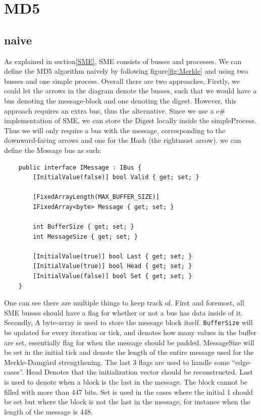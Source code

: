\documentclass[11pt]{article}
\author{John Doe}
\date{\today}
\title{}
\begin{document}
\tableofcontents

\section{MD5}
\label{sec:orgc4d98d5}

\subsection{naive}
\label{MD5naive}
As explained in section\ref{SME}, SME consists of busses and processes. We can define the MD5 algorithm naively by following figure\ref{fig:Merkle} and using two busses and one simple process. Overall there are two approaches,
Firstly, we could let the arrows in the diagram denote the busses, such that we would have a bus denoting the message-block and one denoting the digest. However, this approach requires an extra bus, thus the alternative. Since we use a c\# implementation of SME, we can store the Digest locally inside the simpleProcess. Thus we will only require a bus with the message, corresponding to the downward-facing arrows and one for the Hash (the rightmost arrow).
we can define the Message bus as such:
\begin{verbatim}
    public interface IMessage : IBus {
        [InitialValue(false)] bool Valid { get; set; }

        [FixedArrayLength(MAX_BUFFER_SIZE)]
        IFixedArray<byte> Message { get; set; }

        int BufferSize { get; set; }
        int MessageSize { get; set; }

        [InitialValue(true)] bool Last { get; set; }
        [InitialValue(true)] bool Head { get; set; }
        [InitialValue(false)] bool Set { get; set; }
    }
\end{verbatim}
One can see there are multiple things to keep track of. First and foremost, all SME busses should have a flag for whether or not a bus has data inside of it. Secondly, A byte-array is used to store the message block itself. \texttt{BufferSize} will be updated for every iteration or tick, and denotes how many values in the buffer are set, essentially flag for when the message should be padded. MessageSize will be set in the initial tick and denote the length of the entire message used for the Merkle-Damgård strengthening.
The last 3 flags are used to handle some ``edge-cases''.
Head Denotes that the initialization vector should be reconstructed.
Last is used to denote when a block is the last in the message. The block cannot be filled with more than 447 bits.
Set is used in the cases where the initial 1 should be set but where the block is not the last in the message, for instance when the length of the message is 448.
\end{document}
